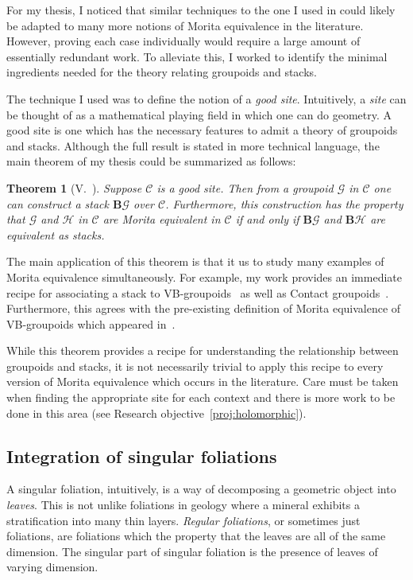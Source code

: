 \documentclass[11pt, letterpaper]{article}
\renewcommand{\H}{\mathcal{H}}
\newcommand{\B}{\mathbf{B}}
\newcommand{\G}{\mathcal{G}}
\newcommand{\C}{\mathcal{C}}
\newtheorem{theorem}{Theorem}
\begin{document}
For my thesis, I noticed that similar techniques to the one I used in \cite{dman} could likely be adapted to many more notions of Morita equivalence in the literature. However, proving each case individually would require a large amount of essentially redundant work. To alleviate this, I worked to identify the minimal ingredients needed for the theory relating groupoids and stacks.

The technique I used was to define the notion of a \emph{good site}. Intuitively, a \emph{site} can be thought of as a mathematical playing field in which one can do geometry. A good site is one which has the necessary features to admit a theory of groupoids and stacks. Although the full result is stated in more technical language, the main theorem of my thesis could be summarized as follows:
\begin{theorem}[V.~\cite{MyThesis}]\label{thm:thesis}
Suppose \(\mathcal{C} \) is a good site. Then from a groupoid \( \G \) in \( \C \) one can construct a stack \( \B \G \) over \( \C \). Furthermore, this construction has the property that \( \G \) and \( \H \) in \( \C \) are Morita equivalent in \( \C \) if and only if \( \B \G \) and \( \B \H \) are equivalent as stacks.
\end{theorem}
The main application of this theorem is that it us to study many examples of Morita equivalence simultaneously. For example, my work provides an immediate recipe for associating a stack to VB-groupoids~\cite{del_Hoyo_2018} as well as Contact groupoids~\cite{Contact_Red}. 
Furthermore, this agrees with the pre-existing definition of Morita equivalence of VB-groupoids which appeared in~\cite{del_Hoyo_2018}.

While this theorem provides a recipe for understanding the relationship between groupoids and stacks, it is not necessarily trivial to apply this recipe to every version of Morita equivalence which occurs in the literature. Care must be taken when finding the appropriate site for each context and there is more work to be done in this area (see Research objective~\ref{proj:holomorphic}).

\subsection{Integration of singular foliations}
A singular foliation, intuitively, is a way of decomposing a geometric object into \emph{leaves}. This is not unlike foliations in geology where a mineral exhibits a stratification into many thin layers. \emph{Regular foliations}, or sometimes just foliations, are foliations which the property that the leaves are all of the same dimension. The singular part of singular foliation is the presence of leaves of varying dimension.
\end{document}

